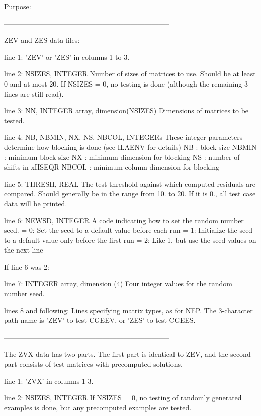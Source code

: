\begin{DoxyParagraph}{Purpose\+: }
\begin{DoxyVerb}
-----------------------------------------------------------------------

 ZEV and ZES data files:

 line 1:  'ZEV' or 'ZES' in columns 1 to 3.

 line 2:  NSIZES, INTEGER
          Number of sizes of matrices to use. Should be at least 0
          and at most 20. If NSIZES = 0, no testing is done
          (although the remaining  3 lines are still read).

 line 3:  NN, INTEGER array, dimension(NSIZES)
          Dimensions of matrices to be tested.

 line 4:  NB, NBMIN, NX, NS, NBCOL, INTEGERs
          These integer parameters determine how blocking is done
          (see ILAENV for details)
          NB     : block size
          NBMIN  : minimum block size
          NX     : minimum dimension for blocking
          NS     : number of shifts in xHSEQR
          NBCOL  : minimum column dimension for blocking

 line 5:  THRESH, REAL
          The test threshold against which computed residuals are
          compared. Should generally be in the range from 10. to 20.
          If it is 0., all test case data will be printed.

 line 6:  NEWSD, INTEGER
          A code indicating how to set the random number seed.
          = 0:  Set the seed to a default value before each run
          = 1:  Initialize the seed to a default value only before the
                first run
          = 2:  Like 1, but use the seed values on the next line

 If line 6 was 2:

 line 7:  INTEGER array, dimension (4)
          Four integer values for the random number seed.

 lines 8 and following:  Lines specifying matrix types, as for NEP.
          The 3-character path name is 'ZEV' to test CGEEV, or
          'ZES' to test CGEES.

-----------------------------------------------------------------------

 The ZVX data has two parts. The first part is identical to ZEV,
 and the second part consists of test matrices with precomputed
 solutions.

 line 1:  'ZVX' in columns 1-3.

 line 2:  NSIZES, INTEGER
          If NSIZES = 0, no testing of randomly generated examples
          is done, but any precomputed examples are tested.


\end{DoxyVerb}
\end{DoxyParagraph}
